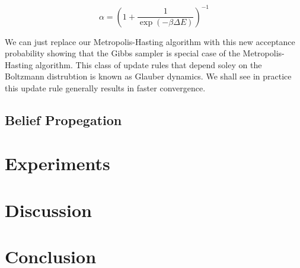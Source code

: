 \documentclass{article}
\begin{document}
\begin{equation}
    \alpha = \left(1 + \frac{1}{\exp(-\beta \Delta E)}\right)^{-1}
\end{equation}

We can just replace our Metropolis-Hasting algorithm with this new acceptance probability showing that the Gibbs sampler is special case of the Metropolis-Hasting algorithm. 
This class of update rules that depend soley on the Boltzmann distrubtion is known as Glauber dynamics. We shall see in practice this update rule generally results in faster convergence.

\subsection{Belief Propegation}

\section{Experiments}



\section{Discussion}

\section{Conclusion}
\end{document}
